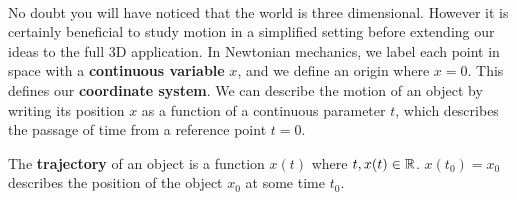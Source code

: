 \documentclass[../newtonian_mechanics.tex]{subfiles}
\begin{document}
        \paragraph{}
        No doubt you will have noticed that the world is three dimensional. However it is certainly beneficial to study motion in a simplified setting before extending our ideas to the full 3D application. In Newtonian mechanics, we label each point in space with a \textbf{continuous variable} $x$, and we define an origin where $x=0$. This defines our \textbf{coordinate system}. We can describe the motion of an object by writing its position $x$ as a function of a continuous parameter $t$, which describes the passage of time from a reference point $t=0$.
        \begin{definition}
            The \textbf{trajectory} of an object is a function $x(t)$ where $t,x(t)\in\mathbb{R}$. $x(t_0)=x_0$ describes the position of the object $x_0$ at some time $t_0$.
        \end{definition}
\end{document}
